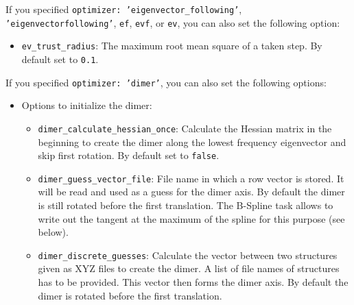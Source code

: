 \documentclass[]{tufte-book}
\begin{document}
If you specified \texttt{optimizer: 'eigenvector\_following'}, \texttt{'eigenvectorfollowing'}, \texttt{ef}, \texttt{evf}, or \texttt{ev}, 
you can also set the following option:
\begin{itemize}
\item \texttt{ev\_trust\_radius}: The maximum root mean square of a taken step. By default set to \texttt{0.1}.
\end{itemize}

If you specified \texttt{optimizer: 'dimer'}, you can also set the following options:
\begin{itemize}
\item Options to initialize the dimer:
\begin{itemize}
\item \texttt{dimer\_calculate\_hessian\_once}: Calculate the Hessian matrix in the beginning to create the dimer along the lowest frequency eigenvector and skip first rotation. By default set to \texttt{false}.
\item \texttt{dimer\_guess\_vector\_file}: File name in which a row vector is stored. It will be read and used as a guess for the dimer axis. By default the dimer is still rotated before the first translation. The B-Spline task allows to write out the tangent at the maximum of the spline for this purpose (see below). 
\item \texttt{dimer\_discrete\_guesses}: Calculate the vector between two structures given as XYZ files to create the dimer. A list of file names of structures has to be provided. This vector then forms the dimer axis. By default the dimer is rotated before the first translation.


\end{itemize}
\end{itemize}
\end{document}
